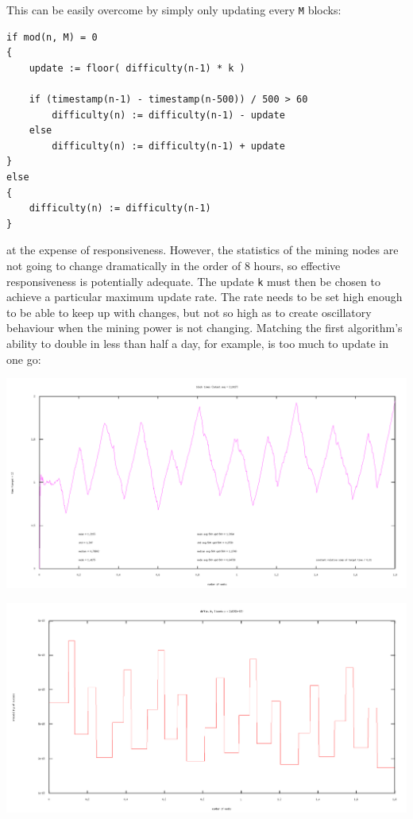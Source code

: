 \documentclass[10pt,a4paper]{article}
\begin{document}
This can be easily overcome by simply only updating every {\tt M} blocks:

\begin{verbatim}
if mod(n, M) = 0
{
    update := floor( difficulty(n-1) * k )

    if (timestamp(n-1) - timestamp(n-500)) / 500 > 60
        difficulty(n) := difficulty(n-1) - update
    else
        difficulty(n) := difficulty(n-1) + update
}
else
{
    difficulty(n) := difficulty(n-1)
}
\end{verbatim}
at the expense of responsiveness. However, the statistics of the mining nodes are not going to change dramatically in the order of 8 hours, so effective responsiveness is potentially adequate. The update {\tt k} must then be chosen to achieve a particular maximum update rate. The rate needs to be set high enough to be able to keep up with changes, but not so high as to create oscillatory behaviour when the mining power is not changing. Matching the first algorithm's ability to double in less than half a day, for example, is too much to update in one go:

\includegraphics[width=14cm]{Diagrams/SimulationGraphs/simulation_avg-500_upd-500_p0-5.png}

\includegraphics[width=14cm]{Diagrams/SimulationGraphs/simulation_avg-500_upd-500_p0-5_diff.png}
\end{document}
